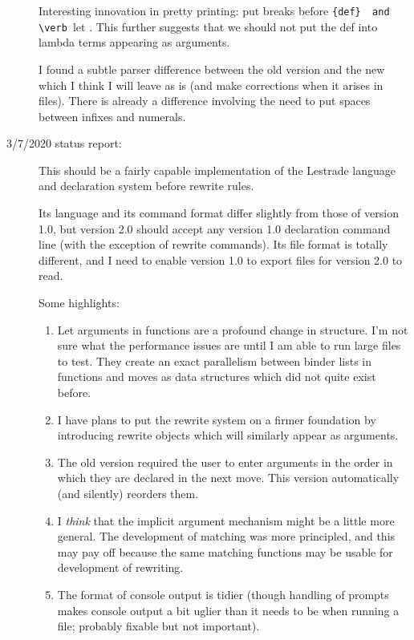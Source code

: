 \documentclass[12pt]{article}
\begin{document}
\begin{description}
Interesting innovation in pretty printing:  put breaks before \verb ({def}  and \verb ({let} .  This further suggests that we should not put the def into lambda terms appearing as arguments.

I found a subtle parser difference between the old version and the new which I think I will leave as is
(and make corrections when it arises in files).  There is already a difference involving the need
to put spaces between infixes and numerals.



\item[3/7/2020 status report:]  This should be a fairly capable implementation of the
Lestrade language and declaration system before rewrite rules.

Its language and its command format differ slightly from those of version 1.0, but
version 2.0 should accept any version 1.0 declaration command line
(with the exception of rewrite commands).  Its file format is
totally different, and I need to enable version 1.0 to export files for version 2.0 to read.

Some highlights:

\begin{enumerate}

\item  Let arguments in functions are a profound change in structure.  I'm not sure what
the performance issues are until I am able to run large files to test.  They create an exact
parallelism between binder lists in functions and moves as data structures which did not quite exist before.

\item  I have plans to put the rewrite system on a firmer foundation by introducing rewrite objects
which will similarly appear as arguments.

\item  The old version required the user to enter arguments in the order in which they are declared in the next move.  This version automatically (and silently) reorders them.

\item  I {\em think\/} that the implicit argument mechanism might be a little more general.  The development
of matching was more principled, and this may pay off because the same matching functions may be usable for
development of rewriting.

\item  The format of console output is tidier (though handling of prompts makes console output
a bit uglier than it needs to be when running a file;  probably fixable but not important).


\end{enumerate}
\end{description}
\end{document}

